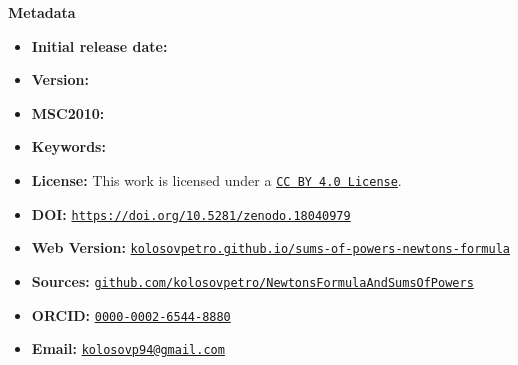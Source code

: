 {\large\textbf{Metadata}}
\begin{itemize}[leftmargin=22pt]
  \item \textbf{Initial release date:} 
  \item \textbf{Version:} 
  \item \textbf{MSC2010:} 
  \item \textbf{Keywords:} 
  \item \textbf{License:} This work is licensed under a \href{https://creativecommons.org/licenses/by/4.0/}{\texttt{CC BY 4.0 License}}.
  \item \textbf{DOI:} \href{https://doi.org/10.5281/zenodo.18040979}{\texttt{https://doi.org/10.5281/zenodo.18040979}}
  \item \textbf{Web Version:} \href{https://kolosovpetro.github.io/sums-of-powers-newtons-formula/}{\texttt{kolosovpetro.github.io/sums-of-powers-newtons-formula}}
  \item \textbf{Sources:} \href{https://github.com/kolosovpetro/NewtonsInterpolationFormulaAndSumsOfPowers}{\texttt{github.com/kolosovpetro/NewtonsFormulaAndSumsOfPowers}}
  \item \textbf{ORCID:} \href{https://orcid.org/0000-0002-6544-8880}{\texttt{0000-0002-6544-8880}}
  \item \textbf{Email:} \href{mailto:kolosovp94@gmail.com}{\texttt{kolosovp94@gmail.com}}
\end{itemize}
